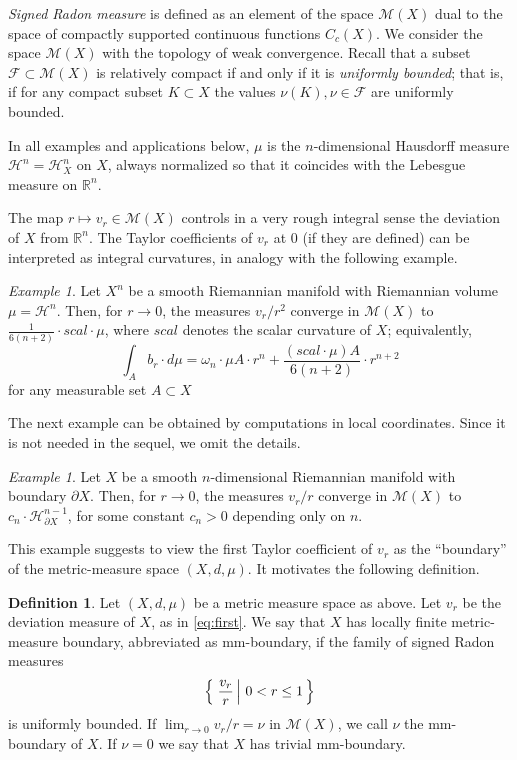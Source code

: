\documentclass[12pt,leqno,intlimits]{amsart}
\numberwithin{equation}{section}
\theoremstyle{definition}
\newtheorem{defn}[thm]{Definition}%
\theoremstyle{remark}
\newtheorem{ex}[thm]{Example}
\newcommand{\R}{\mathbb{R}}
\newcommand*{\set}[2]{\left\{\,\left.{#1}\vphantom{#2}\,\right|\,{#2}\,\right\}}
\begin{document}
\emph{Signed Radon measure} is defined as an element of the space $\mathcal M(X)$ dual to the space of compactly supported continuous functions $C_c (X)$.
We  consider the space $\mathcal M(X)$ with the topology of weak convergence. 
Recall that a subset $\mathcal F \subset \mathcal M(X)$ is relatively compact if and only if 
it is \emph{uniformly bounded};
that is, if for any compact subset $K\subset X$ the values $\nu  (K), \nu \in \mathcal F$ are uniformly bounded.

In all examples and applications below, $\mu$ is the $n$-dimensional Hausdorff measure $\mathcal H^n =\mathcal H^n _X$ on $X$, always normalized so that it coincides with the Lebesgue measure on $\R^n$.


The map $r\mapsto  v_r \in \mathcal M(X)$ controls in a very rough integral sense the deviation of $X$ from $\R^n$.
The Taylor coefficients of $v_r$ at $0$ (if they are defined) can be interpreted as integral curvatures, in analogy with the following example.

\begin{ex} \label{smoothscal}
 Let $X^n$ be a  smooth Riemannian manifold with  Riemannian volume $\mu =\mathcal H^n$.  Then, for $r\to 0$,
the measures $v_r /r^2$ converge in $\mathcal M(X)$ to $\frac 1 {6(n+2)}\cdot scal \cdot \mu$, where
$scal$ denotes the scalar curvature of $X$;
equivalently,  
\[\int_A b_r\cdot d\mu=\omega_n\cdot \mu A\cdot r^n+\frac{(scal\cdot \mu)A}{6(n+2)}\cdot r^{n+2}\]
for any measurable set $A\subset X$
\end{ex}



The next example can be obtained by computations in local coordinates. Since it is not needed in the sequel, we omit
  the details.




  \begin{ex} \label{mainex}
Let $X$ be a smooth $n$-dimensional Riemannian manifold with boundary $\partial X$.
Then, for $r\to 0$, the measures   $v_r/r$  converge in $\mathcal M(X)$ to
$c_n \cdot \mathcal H^{n-1} _{\partial X}$, for some constant $c_n >0$ depending only on $n$.
\end{ex}


This example  suggests  to view the first Taylor coefficient of $v_r$   as the ``boundary'' of the metric-measure space $(X, d, \mu)$.
It motivates the following definition.


\begin{defn} \label{def:first}
Let $(X,d,\mu)$ be a metric measure space as above.  Let   $v_r$ be the deviation measure of $X$,  as in \eqref{eq:first}.
We say that $X$ has   locally finite metric-measure boundary, abbreviated as  mm-boundary,
if the  family of signed Radon measures
\[\set{\frac { v_r }  {r }}{0<r\leq  1}\]
is uniformly bounded.
If  $\lim _{r\to 0} v_r  /r =\nu $ in $\mathcal M(X)$, we call $\nu$ the mm-boundary of $X$.  If $\nu =0$ we say that $X$ has trivial mm-boundary.
\end{defn}
\end{document}
